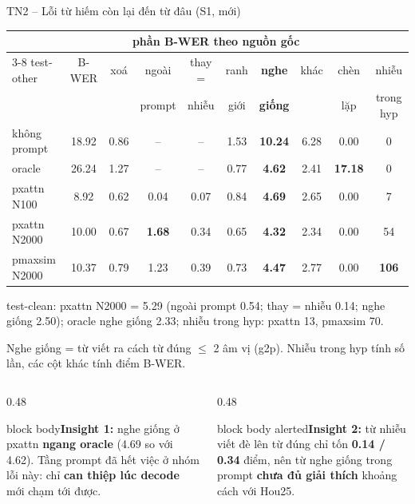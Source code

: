 \documentclass[aspectratio=169,xcolor=table]{beamer}
\newcommand{\hi}[1]{\textcolor{Primary}{\textbf{#1}}}
\newcommand{\bad}[1]{\textcolor{RiskRed}{\textbf{#1}}}
\newcommand{\nbox}[2][block body]{\begin{beamercolorbox}[sep=0.45em,rounded=true]{#1}\footnotesize #2\end{beamercolorbox}}
\begin{document}
\begin{frame}{TN2 -- Lỗi từ hiếm còn lại đến từ đâu (S1, mới)}
\centering\scriptsize\setlength{\tabcolsep}{3.5pt}
\begin{tabular}{lccccccccc}
\toprule
 & & \multicolumn{6}{c}{phần B-WER theo nguồn gốc} & & \\
\cmidrule(lr){3-8}
test-other & B-WER & xoá & ngoài & thay = & ranh & \textbf{nghe} & khác & chèn & nhiễu\\
 & & & prompt & nhiễu & giới & \textbf{giống} & & lặp & trong hyp\\
\midrule
không prompt & 18.92 & 0.86 & -- & -- & 1.53 & \textbf{10.24} & 6.28 & 0.00 & 0\\
oracle & 26.24 & 1.27 & -- & -- & 0.77 & \textbf{4.62} & 2.41 & \bad{17.18} & 0\\
pxattn N100 & 8.92 & 0.62 & 0.04 & 0.07 & 0.84 & \textbf{4.69} & 2.65 & 0.00 & 7\\
pxattn N2000 & 10.00 & 0.67 & \bad{1.68} & 0.34 & 0.65 & \textbf{4.32} & 2.34 & 0.00 & 54\\
pmaxsim N2000 & 10.37 & 0.79 & 1.23 & 0.39 & 0.73 & \textbf{4.47} & 2.77 & 0.00 & \bad{106}\\
\midrule
\bottomrule
\end{tabular}\par
\vspace{0.15cm}\raggedright
{\scriptsize test-clean: pxattn N2000 = 5.29 (ngoài prompt 0.54; thay = nhiễu 0.14; nghe giống 2.50); oracle nghe giống 2.33; nhiễu trong hyp: pxattn 13, pmaxsim 70.}\par
{\scriptsize\color{TextGray} Nghe giống = từ viết ra cách từ đúng $\leq$ 2 âm vị (g2p). Nhiễu trong hyp tính số lần, các cột khác tính điểm B-WER.}\par
\vspace{0.1cm}
\begin{columns}[T]
\begin{column}{0.48\textwidth}
\nbox{\textbf{Insight 1:} nghe giống ở pxattn \textbf{ngang oracle} (4.69 so với 4.62). Tầng prompt đã hết việc ở nhóm lỗi này: chỉ \hi{can thiệp lúc decode} mới chạm tới được.}
\end{column}
\begin{column}{0.48\textwidth}
\nbox[block body alerted]{\textbf{Insight 2:} từ nhiễu viết đè lên từ đúng chỉ tốn \bad{0.14 / 0.34} điểm, nên từ nghe giống trong prompt \textbf{chưa đủ giải thích} khoảng cách với Hou25.}
\end{column}
\end{columns}
\end{frame}
\end{document}
